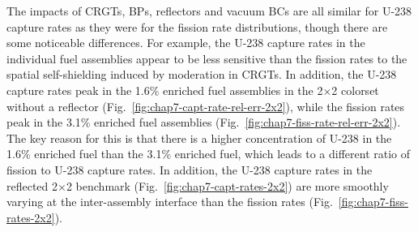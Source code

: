 
The impacts of \acp{CRGT}, \acp{BP}, reflectors and vacuum \acp{BC} are all similar for U-238 capture rates as they were for the fission rate distributions, though there are some noticeable differences. For example, the U-238 capture rates in the individual fuel assemblies appear to be less sensitive than the fission rates to the spatial self-shielding induced by moderation in \acp{CRGT}. In addition, the U-238 capture rates peak in the 1.6\% enriched fuel assemblies in the 2$\times$2 colorset without a reflector (Fig.~\ref{fig:chap7-capt-rate-rel-err-2x2}), while the fission rates peak in the 3.1\% enriched fuel assemblies (Fig.~\ref{fig:chap7-fiss-rate-rel-err-2x2}). The key reason for this is that there is a higher concentration of U-238 in the 1.6\% enriched fuel than the 3.1\% enriched fuel, which leads to a different ratio of fission to U-238 capture rates. In addition, the U-238 capture rates in the reflected 2$\times$2 benchmark (Fig.~\ref{fig:chap7-capt-rates-2x2}) are more smoothly varying at the inter-assembly interface than the fission rates (Fig.~\ref{fig:chap7-fiss-rates-2x2}).

